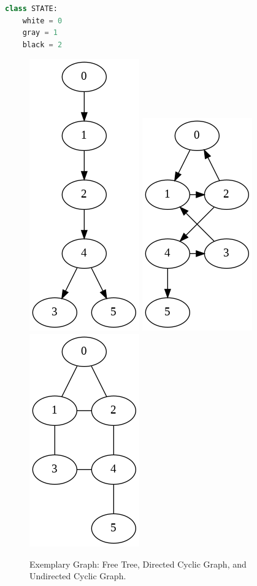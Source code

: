 \documentclass[main.tex]{subfiles}
\begin{document}
\begin{lstlisting}[language=Python, numbers=none]
class STATE:
    white = 0
    gray = 1
    black = 2
\end{lstlisting}
\begin{figure}[!ht]
    \centering
     \includegraphics[width=0.25\columnwidth]{fig/free_tree.png}
     \includegraphics[width=0.25\columnwidth]{fig/directed_cyclic_graph.png}
      \includegraphics[width=0.25\columnwidth]{fig/undirected_cyclic_graph.png}
    \caption{Exemplary Graph: Free Tree, Directed Cyclic Graph, and Undirected Cyclic Graph.}
    \label{fig:graph_search_example}
\end{figure}
\end{document}
